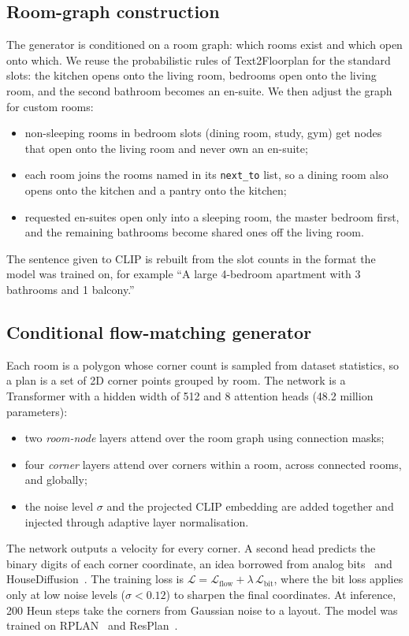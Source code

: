 \documentclass[11pt,a4paper]{article}
\begin{document}
\subsection{Room-graph construction}
The generator is conditioned on a room graph: which rooms exist and which open
onto which. We reuse the probabilistic rules of Text2Floorplan for the standard
slots: the kitchen opens onto the living room, bedrooms open onto the living room,
and the second bathroom becomes an en-suite. We then adjust the graph for custom
rooms:
\begin{itemize}
  \item non-sleeping rooms in bedroom slots (dining room, study, gym) get nodes
        that open onto the living room and never own an en-suite;
  \item each room joins the rooms named in its \texttt{next\_to} list, so a dining
        room also opens onto the kitchen and a pantry onto the kitchen;
  \item requested en-suites open only into a sleeping room, the master bedroom
        first, and the remaining bathrooms become shared ones off the living room.
\end{itemize}
The sentence given to CLIP is rebuilt from the slot counts in the format the
model was trained on, for example ``A large 4-bedroom apartment with 3 bathrooms
and 1 balcony.''

\subsection{Conditional flow-matching generator}
Each room is a polygon whose corner count is sampled from dataset statistics, so
a plan is a set of 2D corner points grouped by room. The network is a Transformer
with a hidden width of 512 and 8 attention heads (48.2 million parameters):
\begin{itemize}
  \item two \emph{room-node} layers attend over the room graph using connection
        masks;
  \item four \emph{corner} layers attend over corners within a room, across
        connected rooms, and globally;
  \item the noise level $\sigma$ and the projected CLIP embedding are added
        together and injected through adaptive layer normalisation.
\end{itemize}
The network outputs a velocity for every corner. A second head predicts the
binary digits of each corner coordinate, an idea borrowed from analog
bits~\cite{analogbits} and HouseDiffusion~\cite{housediffusion}. The training
loss is $\mathcal{L}=\mathcal{L}_{\text{flow}}+\lambda\,\mathcal{L}_{\text{bit}}$,
where the bit loss applies only at low noise levels ($\sigma<0.12$) to sharpen the
final coordinates. At inference, 200 Heun steps take the corners from Gaussian
noise to a layout. The model was trained on RPLAN~\cite{rplan} and
ResPlan~\cite{resplan}.
\end{document}
